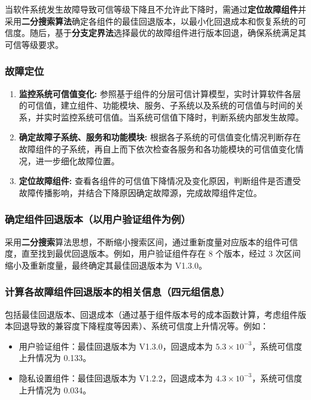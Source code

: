 \documentclass{article}
\begin{document}
当软件系统发生故障导致可信等级下降且不允许此下降时，需通过\textbf{定位故障组件}并采用\textbf{二分搜索算法}确定各组件的最佳回退版本，以最小化回退成本和恢复系统的可信度。随后，基于\textbf{分支定界法}选择最优的故障组件进行版本回退，确保系统满足其可信等级要求。

\subsubsection{故障定位}

\begin{enumerate}
	\item 
	\textbf{监控系统可信值变化:} 参照基于组件的分层可信计算模型，实时计算软件各层的可信值，建立组件、功能模块、服务、子系统以及系统的可信值与时间的关系，并实时监控系统可信值。当系统可信值下降时，判断系统内部发生故障。
	
	\item
	\textbf{确定故障子系统、服务和功能模块:} 根据各子系统的可信值变化情况判断存在故障组件的子系统，再自上而下依次检查各服务和各功能模块的可信值变化情况，进一步细化故障位置。
	
	\item 
	\textbf{定位故障组件:} 查看各组件的可信值下降情况及变化原因，判断组件是否遭受故障传播影响，并结合下降原因确定故障源，完成故障组件定位。
\end{enumerate}

\subsubsection{确定组件回退版本（以用户验证组件为例）}

采用\textbf{二分搜索}算法思想，不断缩小搜索区间，通过重新度量对应版本的组件可信度，直至找到最优回退版本。例如，用户验证组件存在 8 个版本，经过 3 次区间缩小及重新度量，最终确定其最佳回退版本为 V1.3.0。

\subsubsection{计算各故障组件回退版本的相关信息（四元组信息）}

包括最佳回退版本、回退成本（通过基于组件版本号的成本函数计算，考虑组件版本回退导致的兼容度下降程度等因素）、系统可信度上升情况等。例如：

\begin{itemize}
	\item 用户验证组件：最佳回退版本为 V1.3.0，回退成本为 $5.3\times10^{-3}$，系统可信度上升情况为 0.133。
	\item 隐私设置组件：最佳回退版本为 V1.2.2，回退成本为 $4.3\times10^{-3}$，系统可信度上升情况为 0.034。
\end{itemize}
\end{document}
